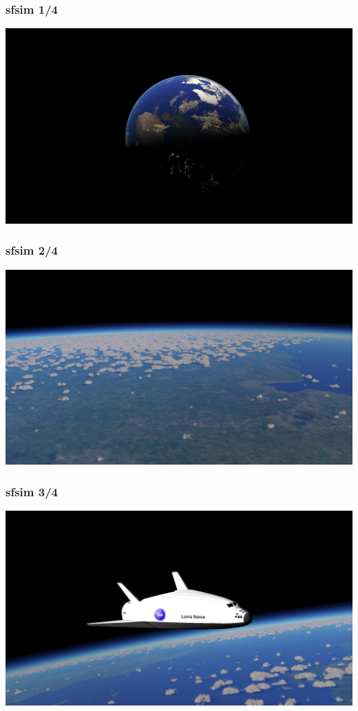 \documentclass[aspectratio=169,11pt,xcolor=dvipsnames]{beamer}
\begin{document}
\begin{frame}
  \frametitle{sfsim 1/4}
  \begin{center}
    \includegraphics[width=.84\textwidth]{sfsim4}
  \end{center}
\end{frame}

\begin{frame}
  \frametitle{sfsim 2/4}
  \begin{center}
    \includegraphics[width=.84\textwidth]{sfsim2}
  \end{center}
\end{frame}

\begin{frame}
  \frametitle{sfsim 3/4}
  \begin{center}
    \includegraphics[width=.84\textwidth]{sfsim1}
  \end{center}
\end{frame}
\end{document}
